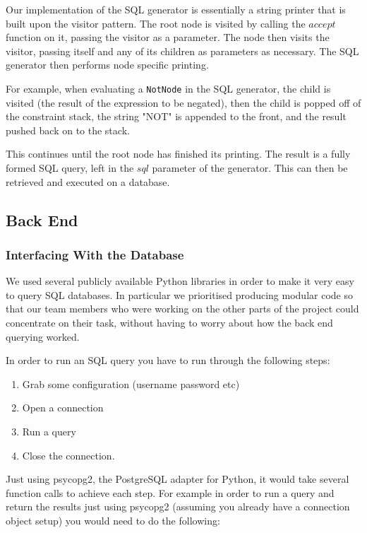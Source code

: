 \documentclass[a4paper, 11pt]{article}
\begin{document}
        Our implementation of the SQL generator is essentially a string
        printer that is built upon the visitor pattern. The root node is
        visited by calling the $accept$ function on it, passing the visitor as
        a parameter. The node then visits the visitor, passing itself and any
        of its children as parameters as necessary. The SQL generator then
        performs node specific printing. 

        For example, when evaluating a \texttt{NotNode} in the SQL generator, the child
        is visited (the result of the expression to be negated), then the child
        is popped off of the constraint stack, the string "NOT" is appended to
        the front, and the result pushed back on to the stack.

        This continues until the root node has finished its printing. The
        result is a fully formed SQL query, left in the $sql$ parameter of the
        generator. This can then be retrieved and executed on a database.

    \subsection{Back End}

    \subsubsection{Interfacing With the Database}

      We used several publicly available Python libraries in order to make 
      it very easy to query SQL databases. In particular we prioritised
      producing modular code so that our team members who were working on the
      other parts of the project could concentrate on their task, without having
      to worry about how the back end querying worked.

      In order to run an SQL query you have to run through the following steps:
      
      \begin{enumerate}
        \item Grab some configuration (username password etc)
        \item Open a connection
        \item Run a query
        \item Close the connection.
      \end{enumerate}

      Just using psycopg2, the PostgreSQL adapter for Python, it would take
      several function calls to achieve each step. For example in order to run a
      query and return the results just using psycopg2 (assuming you already
      have a connection object setup) you would need to do the following:
\end{document}
